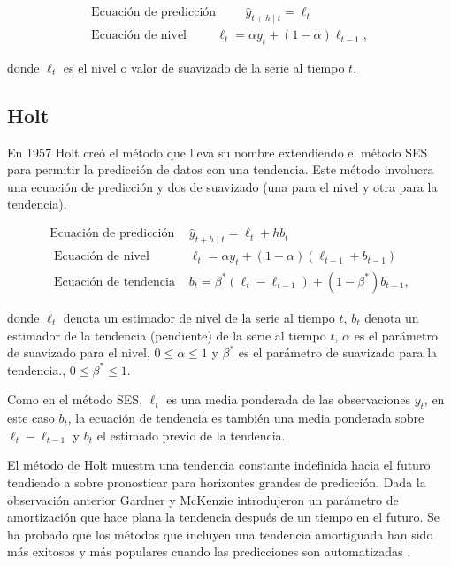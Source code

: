 \begin{equation*}
	\begin{array}{lcl} 
		\textrm{Ecuación de predicción} \hspace{1cm} \hat{y}_{t+h \mid t}=\ell_{t}\\
		\textrm{Ecuación de nivel}\hspace{1cm} \ell_{t}=\alpha y_{t}+(1-\alpha) \ell_{t-1},
	\end{array} 
\end{equation*}

donde $\ell_{t}$ es el nivel o valor de suavizado de la serie al tiempo $t$.  

\subsection{Holt}

En 1957 Holt creó el método que lleva su nombre extendiendo el método SES para permitir la predicción de datos con una tendencia. Este método involucra una ecuación de predicción y dos de suavizado (una para el nivel y otra para la tendencia).

\begin{equation*}
	\begin{array}{lcl} 
		 \text {Ecuación de predicción} & \hat{y}_{t+h \mid t}=\ell_{t}+h b_{t} \\
		\text { Ecuación de nivel } & \ell_{t}=\alpha y_{t}+(1-\alpha)\left(\ell_{t-1}+b_{t-1}\right) \\
		\text { Ecuación de tendencia } & b_{t} =\beta^{*}\left(\ell_{t}-\ell_{t-1}\right)+\left(1-\beta^{*}\right) b_{t-1},
	\end{array} 
\end{equation*}

donde $\ell_{t}$ denota un estimador de nivel de la serie al tiempo $t$,  $b_{t}$ denota un estimador de la tendencia (pendiente) de la serie al tiempo $t$, $\alpha$ es el parámetro de suavizado para el nivel, $0 \leq \alpha \leq 1$ y $\beta^*$ es el parámetro de suavizado para la tendencia., $0 \leq \beta^* \leq 1$.

Como en el método SES, $\ell_{t}$ es una media ponderada de las observaciones $y_t$, en este caso $b_t$, la ecuación de tendencia es también una media ponderada sobre $\ell_{t}-\ell_{t-1}$ y $b_t$ el estimado previo de la tendencia. 

El método de Holt muestra una tendencia constante indefinida hacia el futuro tendiendo a sobre pronosticar para horizontes grandes de predicción. Dada la observación anterior Gardner y McKenzie introdujeron un parámetro de amortización que hace plana la tendencia después de un tiempo en el futuro. Se ha probado que los métodos que incluyen una tendencia amortiguada han sido más exitosos y más populares cuando las predicciones son automatizadas \parencite{hyndmanForecastingPrinciplesPractice2018}. 

